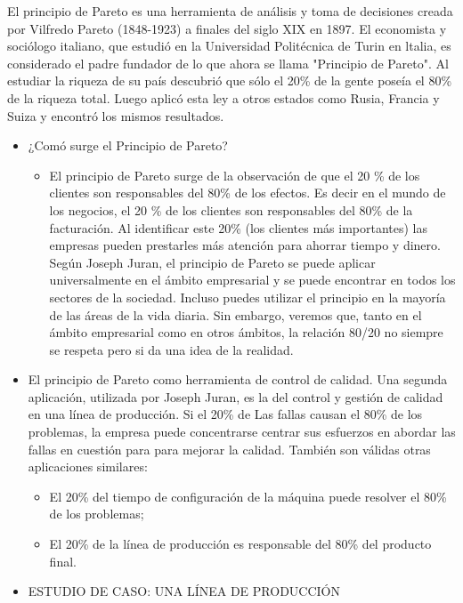 \documentclass{article}
\theoremstyle{mytheoremstyle}
\theoremstyle{mytheoremstyle}
\theoremstyle{myproblemstyle}
\begin{document}
\begin{enumerate}
El principio de Pareto es una herramienta de análisis y toma
de decisiones creada por Vilfredo Pareto (1848-1923)
a finales del siglo XIX en 1897. El economista y sociólogo
italiano, que estudió en la Universidad Politécnica de Turin en
ltalia, es considerado el padre fundador de lo que ahora se
llama "Principio de Pareto". Al estudiar la riqueza de su
país descubrió que sólo el 20\% de la gente poseía el 80\% de la
riqueza total. Luego aplicó esta ley a otros estados como
Rusia, Francia y Suiza y encontró los mismos resultados.
\begin{itemize}
	\item¿Comó surge el Principio de Pareto?
	      \begin{itemize}
		      \item El principio de Pareto surge de la observación de que el 20 \% de los clientes son responsables del 80\% de los efectos. Es decir en el mundo de los negocios, el 20 \% de los clientes son responsables del 80\% de la facturación. Al identificar este 20\% (los clientes más importantes) las empresas pueden prestarles más atención para ahorrar tiempo y dinero. Según Joseph Juran, el principio de Pareto se puede aplicar universalmente en el ámbito empresarial y se puede encontrar en todos los sectores de la sociedad. Incluso puedes utilizar el principio en la mayoría de las áreas de la vida diaria. Sin embargo, veremos que, tanto en el ámbito empresarial como en otros ámbitos, la relación 80/20 no siempre se respeta pero si da una idea de la realidad.
	      \end{itemize}
	\item El principio de Pareto como herramienta de control de calidad.\newline
	Una segunda aplicación, utilizada por Joseph Juran, es la del control
	y gestión de calidad en una línea de producción. Si el 20\% de
	Las fallas causan el 80\% de los problemas, la empresa puede concentrarse
	centrar sus esfuerzos en abordar las fallas en cuestión para
	para mejorar la calidad. También son válidas otras aplicaciones similares:
	\begin{itemize}
		\item El 20\% del tiempo de configuración de la máquina puede resolver el 80\% de los problemas;
		\item El 20\% de la línea de producción es responsable del 80\% del
		producto final.
	\end{itemize}
\newpage
	\item 	ESTUDIO DE CASO: UNA LÍNEA DE PRODUCCIÓN\newline

\end{itemize}
\end{enumerate}
\end{document}
